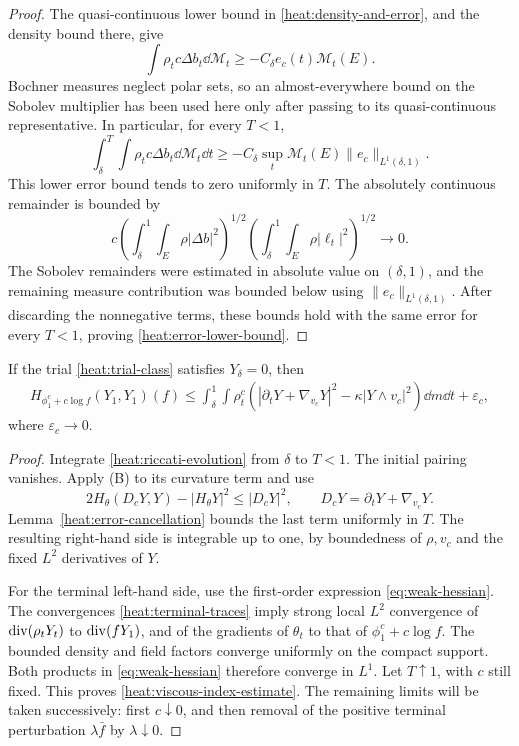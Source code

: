 \begin{proof}
The quasi-continuous lower bound in
\eqref{heat:density-and-error}, and the density bound there,
give
\[
\int\rho_t c\Delta b_t\dd\mathcal M_t
\ge-C_\delta e_c(t)\mathcal M_t(E).
\]
Bochner measures neglect polar sets, so an almost-everywhere
bound on the Sobolev multiplier has been used here only after
passing to its quasi-continuous representative. In particular,
for every \(T<1\),
\[
\int_\delta^T\!\int\rho_t c\Delta b_t\dd\mathcal M_t\dd t
\ge-C_\delta\sup_t\mathcal M_t(E)
\|e_c\|_{L^1(\delta,1)}.
\]
This lower error bound tends to zero uniformly in \(T\).
The absolutely continuous remainder is bounded by
\[
c\left(\int_\delta^1\!\int_E\rho|\Delta b|^2\right)^{1/2}
\left(\int_\delta^1\!\int_E\rho|\ell_t|^2\right)^{1/2}
\longrightarrow0.
\]
The Sobolev remainders were estimated in absolute value on
\((\delta,1)\), and the remaining measure contribution was bounded
below using \(\|e_c\|_{L^1(\delta,1)}\). After discarding the
nonnegative terms, these bounds hold with the same error for every
\(T<1\), proving \eqref{heat:error-lower-bound}.
\end{proof}

\begin{proposition}
\label{heat:viscous-index}
If the trial \eqref{heat:trial-class} satisfies \(Y_\delta=0\),
then
\begin{align}
\label{heat:viscous-index-estimate}
H_{\phi_1^c+c\log f}(Y_1,Y_1)(f)
\le\int_\delta^1\!\int\rho_t^c
\left(|\partial_tY+\nabla_{v_c}Y|^2
-\kappa|Y\wedge v_c|^2\right)\dd m\dd t+\varepsilon_c,
\end{align}
where \(\varepsilon_c\to0\).
\end{proposition}

\begin{proof}
Integrate \eqref{heat:riccati-evolution} from \(\delta\) to
\(T<1\). The initial pairing vanishes. Apply \textup{(B)}
to its curvature term and use
\[
2H_\theta(D_cY,Y)-|H_\theta Y|^2\le|D_cY|^2,
\qquad D_cY=\partial_tY+\nabla_{v_c}Y.
\]
Lemma~\ref{heat:error-cancellation} bounds the last term
uniformly in \(T\). The resulting right-hand side is
integrable up to one, by boundedness of \(\rho,v_c\) and the
fixed \(L^2\) derivatives of \(Y\).

For the terminal left-hand side, use the first-order expression
\eqref{eq:weak-hessian}. The convergences
\eqref{heat:terminal-traces} imply strong local \(L^2\)
convergence of \(\operatorname{div}(\rho_tY_t)\) to
\(\operatorname{div}(fY_1)\), and of the gradients of \(\theta_t\) to
that of \(\phi_1^c+c\log f\). The bounded density and field
factors converge uniformly on the compact support. Both
products in \eqref{eq:weak-hessian} therefore converge in
\(L^1\). Let \(T\uparrow1\), with \(c\) still fixed.
This proves \eqref{heat:viscous-index-estimate}. The remaining
limits will be taken successively: first \(c\downarrow0\),
and then removal of the positive terminal perturbation
\(\lambda\bar f\) by \(\lambda\downarrow0\).
\end{proof}

